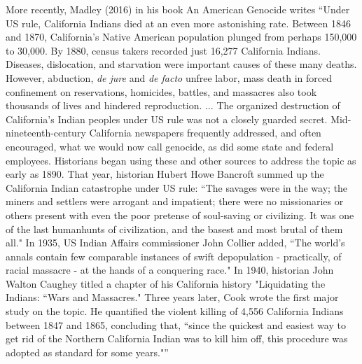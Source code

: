 More recently, Madley (2016) in his book An American Genocide writes “Under US rule, California Indians died at an even more astonishing rate. Between 1846 and 1870, California's Native American population plunged from perhaps 150,000 to 30,000. By 1880, census takers recorded just 16,277 California Indians. Diseases, dislocation, and starvation were important causes of these many deaths. However, abduction, {\sl de jure} and {\sl de facto} unfree labor, mass death in forced confinement on reservations, homicides, battles, and massacres also took thousands of lives and hindered reproduction. $\ldots$ The organized destruction of California's Indian peoples under US rule was not a closely guarded secret. Mid-nineteenth-century California newspapers frequently addressed, and often encouraged, what we would now call genocide, as did some state and federal employees. Historians began using these and other sources to address the topic as early as 1890. That year, historian Hubert Howe Bancroft summed up the California Indian catastrophe under US rule: ``The savages were in the way; the miners and settlers were arrogant and impatient; there were no missionaries or others present with even the poor pretense of soul-saving or civilizing. It was one of the last humanhunts of civilization, and the basest and most brutal of them all." In 1935, US Indian Affairs commissioner John Collier added, ``The world's annals contain few comparable instances of swift depopulation - practically, of racial massacre - at the hands of a conquering race." In 1940, historian John Walton Caughey titled a chapter of his California history "Liquidating the Indians: ``Wars and Massacres." Three years later, Cook wrote the first major study on the topic. He quantified the violent killing of 4,556 California Indians between 1847 and 1865, concluding that, ``since the quickest and easiest way to get rid of the Northern California Indian was to kill him off, this procedure was adopted as standard for some years."”

